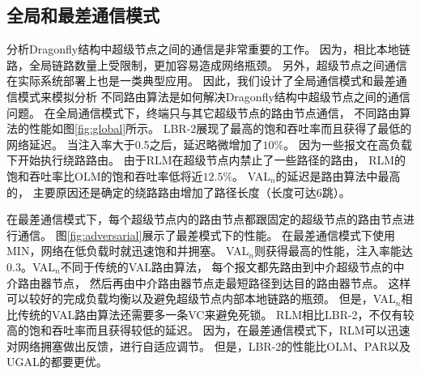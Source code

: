 \subsection{全局和最差通信模式}

分析Dragonfly结构中超级节点之间的通信是非常重要的工作。
因为，相比本地链路，全局链路数量上受限制，更加容易造成网络瓶颈。
另外，超级节点之间通信在实际系统部署上也是一类典型应用。
因此，我们设计了全局通信模式和最差通信模式来模拟分析
不同路由算法是如何解决Dragonfly结构中超级节点之间的通信问题。
在全局通信模式下，终端只与其它超级节点的路由节点通信，
不同路由算法的性能如图\ref{fig:global}所示。
LBR-2展现了最高的饱和吞吐率而且获得了最低的网络延迟。
当注入率大于0.5之后，延迟略微增加了$10\%$。
因为一些报文在高负载下开始执行绕路路由。
由于RLM在超级节点内禁止了一些路径的路由，
RLM的饱和吞吐率比OLM的饱和吞吐率低将近$12.5\%$。
VAL$_n$的延迟是路由算法中最高的，
主要原因还是确定的绕路路由增加了路径长度（长度可达6跳）。

\begin{figure*}[htbp]
  \centering
  \begin{minipage}[t]{\textwidth}
  \centering
  \caption{全局通信模式}
  \label{fig:global}
  \end{minipage}
\end{figure*}

在最差通信模式下，每个超级节点内的路由节点都跟固定的超级节点的路由节点进行通信。
图\ref{fig:adversarial}展示了最差模式下的性能。
在最差通信模式下使用MIN，网络在低负载时就迅速饱和并拥塞。
VAL$_n$则获得最高的性能，注入率能达0.3。VAL$_n$不同于传统的VAL路由算法，
每个报文都先路由到中介超级节点的中介路由器节点，
然后再由中介路由器节点走最短路径到达目的路由器节点。
这样可以较好的完成负载均衡以及避免超级节点内部本地链路的瓶颈。
但是，VAL$_n$相比传统的VAL路由算法还需要多一条VC来避免死锁。
RLM相比LBR-2，不仅有较高的饱和吞吐率而且获得较低的延迟。
因为，在最差通信模式下，RLM可以迅速对网络拥塞做出反馈，进行自适应调节。
但是，LBR-2的性能比OLM、PAR以及UGAL的都要更优。

\begin{figure*}[htbp]
  \centering
  \begin{minipage}[t]{\textwidth}
    \centering
    \caption{最差通信模式}
    \label{fig:adversarial}
  \end{minipage}
\end{figure*}

